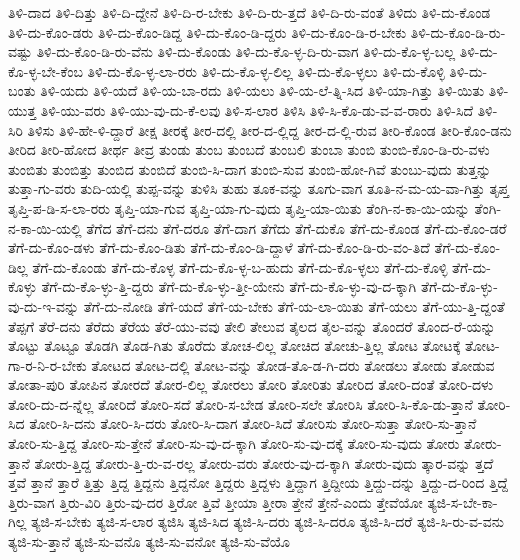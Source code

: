 {ತಿಳಿ-ದಾದ
ತಿಳಿ-ದಿತ್ತು
ತಿಳಿ-ದಿ-ದ್ದೇನೆ
ತಿಳಿ-ದಿ-ರ-ಬೇಕು
ತಿಳಿ-ದಿ-ರು-ತ್ತದೆ
ತಿಳಿ-ದಿ-ರು-ವಂತೆ
ತಿಳಿದು
ತಿಳಿ-ದು-ಕೊಂಡ
ತಿಳಿ-ದು-ಕೊಂ-ಡರು
ತಿಳಿ-ದು-ಕೊಂ-ಡಿದ್ದ
ತಿಳಿ-ದು-ಕೊಂ-ಡಿ-ದ್ದರು
ತಿಳಿ-ದು-ಕೊಂ-ಡಿ-ರ-ಬೇಕು
ತಿಳಿ-ದು-ಕೊಂ-ಡಿ-ರು-ವಷ್ಟು
ತಿಳಿ-ದು-ಕೊಂ-ಡಿ-ರು-ವೆನು
ತಿಳಿ-ದು-ಕೊಂಡು
ತಿಳಿ-ದು-ಕೊ-ಳ್ಳ-ದಿ-ರು-ವಾಗ
ತಿಳಿ-ದು-ಕೊ-ಳ್ಳ-ಬಲ್ಲ
ತಿಳಿ-ದು-ಕೊ-ಳ್ಳ-ಬೇ-ಕೆಂಬ
ತಿಳಿ-ದು-ಕೊ-ಳ್ಳ-ಲಾ-ರರು
ತಿಳಿ-ದು-ಕೊ-ಳ್ಳ-ಲಿಲ್ಲ
ತಿಳಿ-ದು-ಕೊ-ಳ್ಳಲು
ತಿಳಿ-ದು-ಕೊಳ್ಳಿ
ತಿಳಿ-ದು-ಬಂತು
ತಿಳಿ-ಯದು
ತಿಳಿ-ಯದೆ
ತಿಳಿ-ಯ-ಬಾ-ರದು
ತಿಳಿ-ಯಲು
ತಿಳಿ-ಯ-ಲೆ-ತ್ನಿ-ಸಿದ
ತಿಳಿ-ಯಾ-ಗಿತ್ತು
ತಿಳಿ-ಯಿತು
ತಿಳಿ-ಯುತ್ತ
ತಿಳಿ-ಯು-ವರು
ತಿಳಿ-ಯು-ವು-ದು-ಕೆ-ಲವು
ತಿಳಿ-ಸ-ಲಾರ
ತಿಳಿಸಿ
ತಿಳಿ-ಸಿ-ಕೊ-ಡು-ವ-ವ-ರಾರು
ತಿಳಿ-ಸಿದೆ
ತಿಳಿ-ಸಿರಿ
ತಿಳಿಸು
ತಿಳಿ-ಹೇ-ಳಿ-ದ್ದಾರೆ
ತೀಕ್ಷ
ತೀರಕ್ಕೆ
ತೀರ-ದಲ್ಲಿ
ತೀರ-ದ-ಲ್ಲಿದ್ದ
ತೀರ-ದ-ಲ್ಲಿ-ರುವ
ತೀರಿ-ಕೊಂಡ
ತೀರಿ-ಕೊಂ-ಡನು
ತೀರಿದ
ತೀರಿ-ಹೋದ
ತೀರ್ಥ
ತೀವ್ರ
ತುಂಡು
ತುಂಬ
ತುಂಬದೆ
ತುಂಬಲಿ
ತುಂಬಾ
ತುಂಬಿ
ತುಂಬಿ-ಕೊಂ-ಡಿ-ರು-ವಳು
ತುಂಬಿತು
ತುಂಬಿತ್ತು
ತುಂಬಿದ
ತುಂಬಿದೆ
ತುಂಬಿ-ಸಿ-ದಾಗ
ತುಂಬಿ-ಸುವ
ತುಂಬಿ-ಹೋ-ಗಿವೆ
ತುಂಬು-ವುದು
ತುತ್ತನ್ನು
ತುತ್ತಾ-ಗು-ವರು
ತುದಿ-ಯಲ್ಲಿ
ತುಪ್ಪ-ವನ್ನು
ತುಳಿಸಿ
ತುಹು
ತೂಕ-ವನ್ನು
ತೂಗು-ವಾಗ
ತೂತಿ-ನ-ಮ-ಯ-ವಾ-ಗಿತ್ತು
ತೃಪ್ತ
ತೃಪ್ತಿ-ಪ-ಡಿ-ಸ-ಲಾ-ರರು
ತೃಪ್ತಿ-ಯಾ-ಗುವ
ತೃಪ್ತಿ-ಯಾ-ಗು-ವುದು
ತೃಪ್ತಿ-ಯಾ-ಯಿತು
ತೆಂಗಿ-ನ-ಕಾ-ಯಿ-ಯನ್ನು
ತೆಂಗಿ-ನ-ಕಾ-ಯಿ-ಯಲ್ಲಿ
ತೆಗೆದ
ತೆಗೆ-ದನು
ತೆಗೆ-ದರೂ
ತೆಗೆ-ದಾಗ
ತೆಗೆದು
ತೆಗೆ-ದುಕೊ
ತೆಗೆ-ದು-ಕೊಂಡ
ತೆಗೆ-ದು-ಕೊಂ-ಡರೆ
ತೆಗೆ-ದು-ಕೊಂ-ಡಳು
ತೆಗೆ-ದು-ಕೊಂ-ಡಿತು
ತೆಗೆ-ದು-ಕೊಂ-ಡಿ-ದ್ದಾಳೆ
ತೆಗೆ-ದು-ಕೊಂ-ಡಿ-ರು-ವಂ-ತಿದೆ
ತೆಗೆ-ದು-ಕೊಂ-ಡಿಲ್ಲ
ತೆಗೆ-ದು-ಕೊಂಡು
ತೆಗೆ-ದು-ಕೊಳ್ಳ
ತೆಗೆ-ದು-ಕೊ-ಳ್ಳ-ಬ-ಹುದು
ತೆಗೆ-ದು-ಕೊ-ಳ್ಳಲು
ತೆಗೆ-ದು-ಕೊಳ್ಳಿ
ತೆಗೆ-ದು-ಕೊಳ್ಳು
ತೆಗೆ-ದು-ಕೊ-ಳ್ಳು-ತ್ತಿ-ದ್ದರು
ತೆಗೆ-ದು-ಕೊ-ಳ್ಳು-ತ್ತೀ-ಯೇನು
ತೆಗೆ-ದು-ಕೊ-ಳ್ಳು-ವು-ದ-ಕ್ಕಾಗಿ
ತೆಗೆ-ದು-ಕೊ-ಳ್ಳು-ವು-ದು-ಇ-ವನ್ನು
ತೆಗೆ-ದು-ನೋಡಿ
ತೆಗೆ-ಯದೆ
ತೆಗೆ-ಯ-ಬೇಕು
ತೆಗೆ-ಯ-ಲಾ-ಯಿತು
ತೆಗೆ-ಯಲು
ತೆಗೆ-ಯು-ತ್ತಿ-ದ್ದಂತೆ
ತೆಪ್ಪಗೆ
ತೆರೆ-ದನು
ತೆರೆದು
ತೆರೆಯ
ತೆರೆ-ಯು-ವವು
ತೇಲಿ
ತೇಲುವ
ತೈಲದ
ತೈಲ-ವನ್ನು
ತೊಂದರೆ
ತೊಂದ-ರೆ-ಯನ್ನು
ತೊಟ್ಟು
ತೊಟ್ಟೂ
ತೊಡಗಿ
ತೊಡ-ಗಿತು
ತೊರೆದು
ತೋಚ-ಲಿಲ್ಲ
ತೋಚಿದ
ತೋಚು-ತ್ತಿಲ್ಲ
ತೋಟ
ತೋಟಕ್ಕೆ
ತೋಟ-ಗಾ-ರ-ನಿ-ರ-ಬೇಕು
ತೋಟದ
ತೋಟ-ದಲ್ಲಿ
ತೋಟ-ವನ್ನು
ತೋಡ-ತೊ-ಡ-ಗಿ-ದರು
ತೋಡಲು
ತೋಡು
ತೋಡುವ
ತೋತಾ-ಪುರಿ
ತೋಪಿನ
ತೋರದೆ
ತೋರ-ಲಿಲ್ಲ
ತೋರಲು
ತೋರಿ
ತೋರಿತು
ತೋರಿದ
ತೋರಿ-ದಂತೆ
ತೋರಿ-ದಳು
ತೋರಿ-ದು-ದ-ನ್ನೆಲ್ಲ
ತೋರಿದೆ
ತೋರಿ-ಸದೆ
ತೋರಿ-ಸ-ಬೇಡ
ತೋರಿ-ಸಲೇ
ತೋರಿಸಿ
ತೋರಿ-ಸಿ-ಕೊ-ಡು-ತ್ತಾನೆ
ತೋರಿ-ಸಿದ
ತೋರಿ-ಸಿ-ದನು
ತೋರಿ-ಸಿ-ದರು
ತೋರಿ-ಸಿ-ದಾಗ
ತೋರಿ-ಸಿದೆ
ತೋರಿಸು
ತೋರಿ-ಸುತ್ತಾ
ತೋರಿ-ಸು-ತ್ತಾನೆ
ತೋರಿ-ಸು-ತ್ತಿದ್ದ
ತೋರಿ-ಸು-ತ್ತೇನೆ
ತೋರಿ-ಸು-ವು-ದ-ಕ್ಕಾಗಿ
ತೋರಿ-ಸು-ವು-ದಕ್ಕೆ
ತೋರಿ-ಸು-ವುದು
ತೋರು
ತೋರು-ತ್ತಾನೆ
ತೋರು-ತ್ತಿದ್ದ
ತೋರು-ತ್ತಿ-ರು-ವ-ರಲ್ಲ
ತೋರು-ವರು
ತೋರು-ವು-ದ-ಕ್ಕಾಗಿ
ತೋರು-ವುದು
ತ್ಕಾರ-ವನ್ನು
ತ್ತದೆ
ತ್ತವೆ
ತ್ತಾನೆ
ತ್ತಾರೆ
ತ್ತಿತ್ತು
ತ್ತಿದ್ದ
ತ್ತಿದ್ದನು
ತ್ತಿದ್ದನೋ
ತ್ತಿದ್ದರು
ತ್ತಿದ್ದಳು
ತ್ತಿದ್ದಾಗ
ತ್ತಿದ್ದೀಯ
ತ್ತಿದ್ದು-ದನ್ನು
ತ್ತಿದ್ದು-ದ-ರಿಂದ
ತ್ತಿದ್ದೆ
ತ್ತಿರು-ವಾಗ
ತ್ತಿರು-ವಿರಿ
ತ್ತಿರು-ವು-ದರ
ತ್ತಿರೋ
ತ್ತಿವೆ
ತ್ತೀಯಾ
ತ್ತೀರಾ
ತ್ತೇನೆ
ತ್ತೇನೆ-ಎಂದು
ತ್ತೇವೆಯೋ
ತ್ಯಜಿ-ಸ-ಬೇ-ಕಾ-ಗಿಲ್ಲ
ತ್ಯಜಿ-ಸ-ಬೇಕು
ತ್ಯಜಿ-ಸ-ಲಾರ
ತ್ಯಜಿಸಿ
ತ್ಯಜಿ-ಸಿದ
ತ್ಯಜಿ-ಸಿ-ದರು
ತ್ಯಜಿ-ಸಿ-ದರೂ
ತ್ಯಜಿ-ಸಿ-ದರೆ
ತ್ಯಜಿ-ಸಿ-ರು-ವ-ವನು
ತ್ಯಜಿ-ಸು-ತ್ತಾನೆ
ತ್ಯಜಿ-ಸು-ವನೊ
ತ್ಯಜಿ-ಸು-ವನೋ
ತ್ಯಜಿ-ಸು-ವೆಯೊ
}

